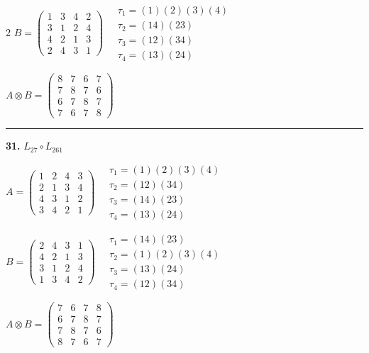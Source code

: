 \begin{multicols}{2}
$B = \begin{pmatrix} 1 & 3 & 4 & 2 \\ 3 & 1 & 2 & 4 \\ 4 & 2 & 1 & 3 \\ 2 & 4 & 3 & 1 \end{pmatrix} \quad \begin{matrix} \tau_{1}=(1)(2)(3)(4) \\ \tau_{2}=(1 4)(2 3) \\ \tau_{3}=(1 2)(3 4) \\ \tau_{4}=(1 3)(2 4) \end{matrix}$

$A \otimes B = \begin{pmatrix} 8 & 7 & 6 & 7 \\ 7 & 8 & 7 & 6 \\ 6 & 7 & 8 & 7 \\ 7 & 6 & 7 & 8 \end{pmatrix}$

\vspace{0.3em}
\hrule
\vspace{0.3em}

\noindent\textbf{31.} $L_{27} \circ L_{261}$

$A = \begin{pmatrix} 1 & 2 & 4 & 3 \\ 2 & 1 & 3 & 4 \\ 4 & 3 & 1 & 2 \\ 3 & 4 & 2 & 1 \end{pmatrix} \quad \begin{matrix} \tau_{1}=(1)(2)(3)(4) \\ \tau_{2}=(1 2)(3 4) \\ \tau_{3}=(1 4)(2 3) \\ \tau_{4}=(1 3)(2 4) \end{matrix}$

$B = \begin{pmatrix} 2 & 4 & 3 & 1 \\ 4 & 2 & 1 & 3 \\ 3 & 1 & 2 & 4 \\ 1 & 3 & 4 & 2 \end{pmatrix} \quad \begin{matrix} \tau_{1}=(1 4)(2 3) \\ \tau_{2}=(1)(2)(3)(4) \\ \tau_{3}=(1 3)(2 4) \\ \tau_{4}=(1 2)(3 4) \end{matrix}$

$A \otimes B = \begin{pmatrix} 7 & 6 & 7 & 8 \\ 6 & 7 & 8 & 7 \\ 7 & 8 & 7 & 6 \\ 8 & 7 & 6 & 7 \end{pmatrix}$


\end{multicols}
